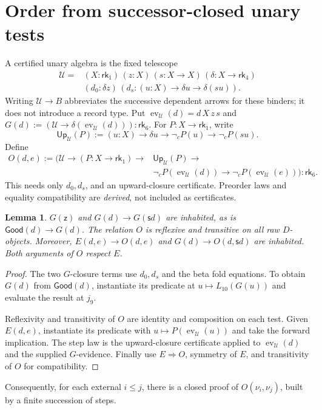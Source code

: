\documentclass[11pt,a4paper]{article}
\newcommand{\rk}[1]{\mathsf{rk}_{#1}}
\newcommand{\Good}{\mathsf{Good}}
\newcommand{\ev}{\operatorname{ev}}
\newcommand{\z}{\mathsf z}
\newcommand{\suc}{\mathsf s}
\newcommand{\nc}{\mathop{\neg}\nolimits_c}
\newcommand{\Up}{\mathsf{Up}}
\newtheorem{lemma}{Lemma}
\theoremstyle{remark}\newtheorem*{remark}{Remark}
\begin{document}
\section{Order from successor-closed unary tests}\label{sec:order}
A certified unary algebra is the fixed telescope
\[
 \begin{aligned}
 \mathcal U={}&(X:\rk1)\,(z:X)\,(s:X\to X)\,(\delta:X\to\rk4)\\
             &(d_0:\delta z)\,
      (d_s:(u:X)\to\delta u\to\delta(su)).
 \end{aligned}
\]
Writing $\mathcal U\to B$ abbreviates the successive dependent arrows for
these binders; it does not introduce a record type.
Put $\ev_{\mathcal U}(d)=d\,X\,z\,s$ and
$G(d):=(\mathcal U\to\delta(\ev_{\mathcal U}(d))):\rk6$.
For $P:X\to\rk1$, write
\[
 \Up_{\mathcal U}(P):=
 (u:X)\to\delta u\to\nc P(u)\to\nc P(su).
\]
Define
\[
 \boxed{\begin{aligned}
 O(d,e):=\bigl(\mathcal U\to(P:X\to\rk1)\to{}&\Up_{\mathcal U}(P)\to{}\\
 &\nc P(\ev_{\mathcal U}(d))\to\nc P(\ev_{\mathcal U}(e))\bigr):\rk6.
 \end{aligned}}
\]
This needs only $d_0,d_s$, and an upward-closure certificate. Preorder laws
and equality compatibility are \emph{derived}, not included as certificates.

\begin{lemma}\label{basic}
$G(\z)$ and $G(d)\to G(\suc d)$ are inhabited, as is
$\Good(d)\to G(d)$. The relation $O$ is reflexive and transitive on all raw
$D$-objects. Moreover, $E(d,e)\to O(d,e)$ and
$G(d)\to O(d,\suc d)$ are inhabited. Both arguments of $O$ respect $E$.
\end{lemma}
\begin{proof}
The two $G$-closure terms use $d_0,d_s$ and the beta fold equations. To
obtain $G(d)$ from $\Good(d)$, instantiate its predicate at
$u\mapsto L_{10}(G(u))$ and evaluate the result at $j_9$.

Reflexivity and transitivity of $O$ are identity and composition on each
test. Given $E(d,e)$, instantiate its predicate with
$u\mapsto P(\ev_{\mathcal U}(u))$ and take the forward implication.
The step law is the upward-closure certificate applied to
$\ev_{\mathcal U}(d)$ and the supplied $G$-evidence. Finally use
$E\Rightarrow O$, symmetry of $E$, and transitivity of $O$ for compatibility.
\end{proof}
Consequently, for each external $i\le j$, there is a closed proof of
$O(\nu_i,\nu_j)$, built by a finite succession of steps.
\end{document}
